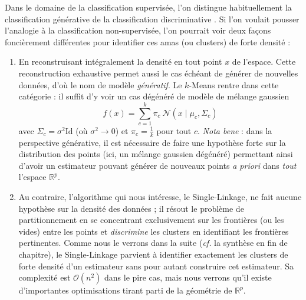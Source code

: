 Dans le domaine de la classification {supervisée}, l'on distingue habituellement la classification générative de la classification discriminative \cite{NgJordan2001}.
Si l'on voulait pousser l'analogie à la classification non-supervisée, l'on pourrait voir deux façons foncièrement différentes pour identifier ces amas (ou clusters) de forte densité :
\begin{enumerate}
\item En reconstruisant intégralement la densité en tout point $x$ de l'espace. Cette reconstruction exhaustive permet aussi le cas échéant de générer de nouvelles données, d'où le nom de modèle \emph{génératif}. Le $k$-{Means} rentre dans cette catégorie : il suffit d'y voir un cas dégénéré de modèle de mélange gaussien \cite{GaussianMixture}
\[ 
    f(x) = \sum_{c=1}^k \pi_c \ \mathcal{N}(x \mid \mu_c, \Sigma_c)
\]
avec $\Sigma_c = \sigma^2 \mathrm{Id}$ (où $\sigma^2 \to 0$) et $\pi_c = \frac{1}{k}$ pour tout $c$. 
\emph{Nota bene} : dans la perspective générative, il est nécessaire de faire une hypothèse forte sur la distribution des points (ici, un mélange gaussien dégénéré) %
permettant ainsi d'avoir un estimateur pouvant générer de nouveaux points \emph{a priori} dans \emph{tout} l'espace $\mathbb R^p$.
\item Au contraire, l'algorithme qui nous intéresse, le Single-Linkage, ne fait aucune hypothèse sur la densité des données ; il résout le problème de partitionnement en se concentrant exclusivement sur les frontières (ou les vides) entre les points et \emph{discrimine} les clusters en identifiant les frontières pertinentes. 
Comme nous le verrons dans la suite (\emph{cf.} la synthèse en fin de chapitre), le Single-Linkage parvient à identifier exactement les clusters de forte densité d'un estimateur sans pour autant construire cet estimateur.
Sa complexité est $\mathcal{O}(n^2)$ dans le pire cas, mais nous verrons qu'il existe d'importantes optimisations tirant parti de la géométrie de $\mathbb R^p$.
\end{enumerate}



